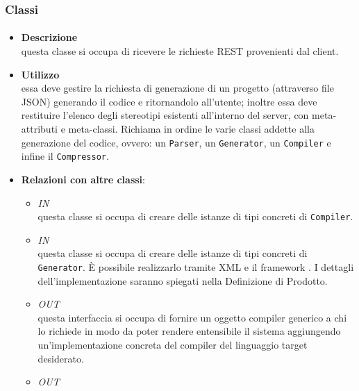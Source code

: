 \subsubsection{Classi}
\paragraph{}
\label{\nogloxy{SWEDesigner::Server::Controller::RequestHandlerController}}
\begin{itemize}
\item \textbf{Descrizione}\\
questa classe si occupa di ricevere le richieste REST provenienti dal client.
\item \textbf{Utilizzo}\\
essa deve gestire la richiesta di generazione di un progetto (attraverso file JSON) generando il codice e ritornandolo all'utente; inoltre essa deve restituire l'elenco degli stereotipi esistenti all'interno del server, con meta-attributi e meta-classi.
Richiama in ordine le varie classi addette alla generazione del codice, ovvero: un \texttt{Parser}, un \texttt{Generator}, un \texttt{Compiler} e infine il \texttt{Compressor}. 
\item \textbf{Relazioni con altre classi}:
\begin{itemize}
\item \textit{IN} \hyperref[\nogloxy{SWEDesigner::Server::Compiler::CompilerAssembler}]{}\\
questa classe si occupa di creare delle istanze di tipi concreti di \texttt{Compiler}. 
\item \textit{IN} \hyperref[\nogloxy{SWEDesigner::Server::Generator::GeneratorAssembler}]{}\\
questa classe si occupa di creare delle istanze di tipi concreti di \texttt{Generator}. È possibile realizzarlo tramite XML e il framework \spring. I dettagli dell'implementazione saranno spiegati nella Definizione di Prodotto. %
\item \textit{OUT} \hyperref[\nogloxy{SWEDesigner::Server::Compiler::Compiler}]{}\\
questa interfaccia si occupa di fornire un oggetto compiler generico a chi lo richiede in modo da poter rendere entensibile il sistema aggiungendo un'implementazione concreta del compiler del linguaggio target desiderato.
\item \textit{OUT} \hyperref[\nogloxy{SWEDesigner::Server::Generator::Generator}]{}\\

\end{itemize}
\end{itemize}
